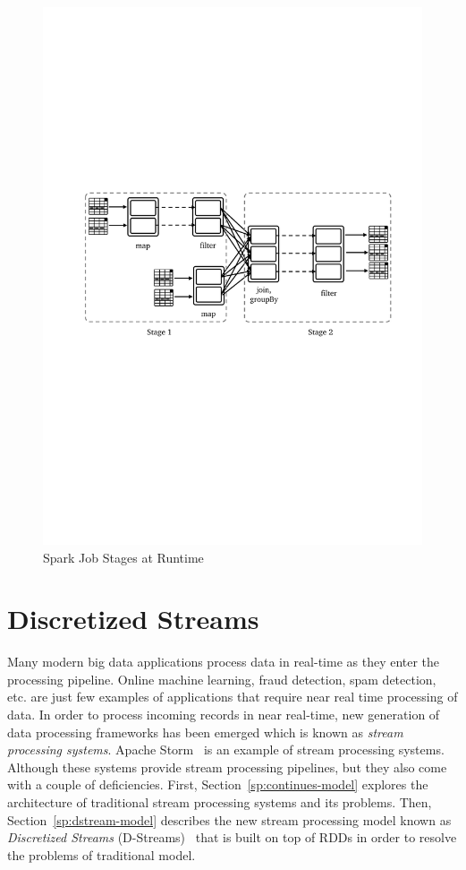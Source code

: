 \begin{figure}[!htbp]
    \centering
    \includegraphics[clip,trim=2.3cm 11.4cm 1.7cm 10cm]{stage-dag.pdf}
    \caption{Spark Job Stages at Runtime}
    \label{fig:sp:dag}
\end{figure}

\section{Discretized Streams}
\label{sp:dstream}
Many modern big data applications process data in real-time as they enter the processing pipeline. Online machine learning, fraud detection, spam detection, etc. are just few examples of applications that require near real time processing of data. In order to process incoming records in near real-time, new generation of data processing frameworks has been emerged which is known as \emph{stream processing systems}. Apache Storm~\cite{Storm} is an example of stream processing systems. Although these systems provide stream processing pipelines, but they also come with a couple of deficiencies. First, Section~\ref{sp:continues-model} explores the architecture of traditional stream processing systems and its problems. Then, Section~\ref{sp:dstream-model} describes the new stream processing model known as \emph{Discretized Streams} (D-Streams)~\cite{Zaharia:2013} that is built on top of RDDs in order to resolve the problems of traditional model.

